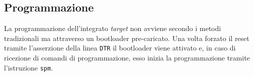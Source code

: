 \subsection{Programmazione}

La programmazione dell'integrato \textit{target} non avviene secondo i metodi tradizionali ma attraverso un bootloader pre-caricato\cite[bootloaders/atmega/ATmegaBOOT\_168.c]{git:arduinocore}. 
Una volta forzato il reset tramite l'asserzione della linea \texttt{DTR} il bootloader viene attivato e, in caso di ricezione di comandi di programmazione, esso inizia la programmazione tramite l'istruzione \texttt{spm}.
